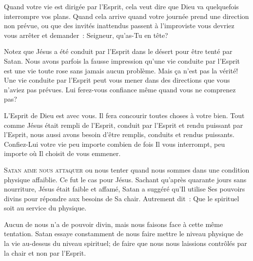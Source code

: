 Quand votre vie est dirigée par l'Esprit, cela veut dire que Dieu
 va quelquefois interrompre vos plans. Quand cela arrive
 \ocadr quand votre journée prend une direction non prévue,
 ou que des invités inattendus passent à l'improviste \fcadr{}
 vous devriez vous arrêter et demander~: 
 \og Seigneur, qu'as-Tu en tête? \fg{} 


Notez que Jésus a été conduit par l'Esprit dans le désert pour être tenté
 par Satan. Nous avons parfois la fausse impression qu'une vie conduite
 par l'Esprit est une vie toute rose sans jamais aucun problème.
 Mais ça n'est pas la vérité! Une vie conduite par l'Esprit
 peut vous mener dans des directions que vous n'aviez pas prévues.
 Lui ferez-vous confiance même quand vous ne comprenez pas?

L'Esprit de Dieu est avec vous. Il fera concourir toutes choses à votre bien.
 Tout comme Jésus était rempli de l'Esprit, conduit par l'Esprit
 et rendu puissant par l'Esprit, nous aussi avons besoin d'être remplis,
 conduits et rendus puissants. Confiez-Lui votre vie
 \ocadr peu importe combien de fois Il vous interrompt,
 peu importe où Il choisit de vous emmener.

\dvrule






\lettrine{S}{atan aime nous attaquer} ou nous tenter
 quand nous sommes dans une condition physique affaiblie.
 Ce fut le cas pour Jésus. Sachant qu'après quarante jours sans nourriture,
 Jésus était faible et affamé, Satan a suggéré qu'Il utilise
 Ses pouvoirs divins pour répondre aux besoins de Sa chair.
 Autrement dit~: 
 \og Que le spirituel soit au service du physique. \fg{}

Aucun de nous n'a de pouvoir divin, mais nous faisons face
 à cette même tentation. Satan essaye constamment de nous faire mettre
 le niveau physique de la vie au-dessus du niveau spirituel;
 de faire que nous nous laissions contrôlés par la chair et non par l'Esprit.

